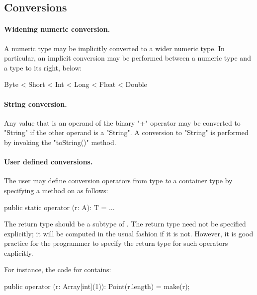 \subsection{Conversions}

\paragraph{Widening numeric conversion.}
A numeric type may be implicitly converted to a wider numeric type. In
particular, an implicit conversion may be performed between a numeric
type and a type to its right, below:

\begin{xten}
Byte < Short < Int < Long < Float < Double
\end{xten}


\paragraph{String conversion.}
Any value that is an operand of the binary
\xcd"+" operator may
be converted to \xcd"String" if the other operand is a \xcd"String".
A conversion to \xcd"String" is performed by invoking the \xcd"toString()"
method.


\paragraph{User defined conversions.}\label{sec:user-defined-conversions}

The user may define conversion operators from type  {\em to} a
container type  by specifying a method on  as follows:

\begin{xten}
  public static operator (r: A): T = ... 
\end{xten}

The return type  should be a subtype of . The return
type need not be specified explicitly; it will be computed in the
usual fashion if it is not. However, it is good practice for the
programmer to specify the return type for such operators explicitly.

For instance, the code for  contains:

\begin{xten}
  public operator (r: Array[int](1)): Point(r.length) = make(r);
\end{xten}

